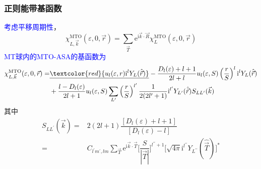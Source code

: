 \frame
{
	\frametitle{正则能带基函数}

	\textcolor{blue}{考虑平移周期性}，
$$\chi_{L,\vec k}^{\mathrm{MTO}}(\varepsilon,0,\vec r)=\sum_{\vec T}\mathrm{e}^{\mathrm{i}\vec k\cdot\vec R}\chi_L^{\mathrm{MTO}}(\varepsilon,0,\vec r)$$
\textcolor{blue}{\textrm{MT}球内的\textrm{MTO-ASA}的基函数为}
{\fontsize{9.0pt}{5.2pt}\selectfont
\begin{displaymath}
	\begin{aligned}
		\chi_{L,\vec k}^{\mathrm{MTO}}(\varepsilon,0,\vec r)=&\underline{\textcolor{red}{u_l(\varepsilon,r)\mathrm{i}^lY_L(\hat{\vec r})}}-\dfrac{D_l(\varepsilon)+l+1}{2l+l}u_l(\varepsilon,S)\left(\dfrac rS\right)^l\mathrm{i}^lY_L(\hat{\vec r})\\
		&+\dfrac{l-D_l(\varepsilon)}{2l+1}u_l(\varepsilon,S)\sum_{L^{\prime}}\left(\dfrac rS\right)^{l^{\prime}}\dfrac1{2(2l^{\prime}+1)}\mathrm{i}^{l^{\prime}}Y_{L^{\prime}}(\hat{\vec r})S_{LL^{\prime}}(\vec k)
	\end{aligned}
\end{displaymath}}
其中
\begin{displaymath}
	\begin{aligned}
		S_{LL^{\prime}}(\vec k)=&2(2l+1)\dfrac{[D_l(\varepsilon)+l+1]}{[D_l(\varepsilon)-l]}\\
		=&C_{l^{\prime}m^{\prime},lm}\sum_{\vec T}\mathrm{e}^{\mathrm{i}\vec k\cdot\vec T}\bigg[\dfrac S{|\vec T|}\bigg]^{l^{\prime\prime}+1}\big[\sqrt{4\pi}\mathrm{i}^{l^{\prime\prime}}Y_{L^{\prime\prime}}(\hat{\vec T})\big]^{\ast}
	\end{aligned}
\end{displaymath}
}

